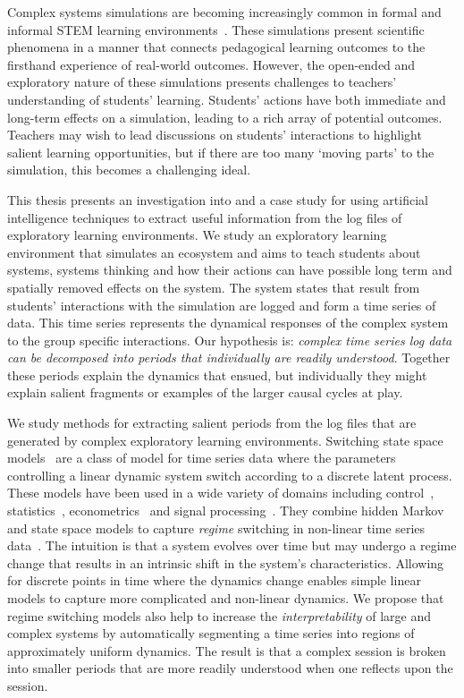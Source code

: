 Complex systems simulations are becoming increasingly common in formal and informal STEM learning environments~\citep{smordal2012hybrid}. These simulations present scientific phenomena in a manner that connects pedagogical learning outcomes to the firsthand experience of real-world outcomes. However, the open-ended and exploratory nature of these simulations presents challenges to teachers' understanding of students' learning. Students' actions have both immediate and long-term effects on a simulation, leading to a rich array of potential outcomes. Teachers may wish to lead discussions on students' interactions to highlight salient learning opportunities, but if there are too many `moving parts' to the simulation, this becomes a challenging ideal.

This thesis presents an investigation into and a case study for using artificial intelligence techniques to extract useful information from the log files of exploratory learning environments. We study an exploratory learning environment that simulates an ecosystem and aims to teach students about systems, systems thinking and how their actions can have possible long term and spatially removed effects on the system. The system states that result from students' interactions with the simulation are logged and form a time series of data. This time series represents the dynamical responses of the complex system to the group specific interactions. Our hypothesis is: \textit{complex time series log data can be decomposed into periods that individually are readily understood}. Together these periods explain the dynamics that ensued, but individually they might explain salient fragments or examples of the larger causal cycles at play.

We study methods for extracting salient periods from the log files that are generated by complex exploratory learning environments. Switching state space models~\citep{ghahramani2000variational} are a class of model for time series data where the parameters controlling a linear dynamic system switch according to a discrete latent process. These models have been used in a wide variety of domains including control~\citep{ikoma2002tracking}, statistics~\citep{cappe2009inference}, econometrics~\citep{giordani2007unified} and signal processing~\citep{kim1999state}. They combine hidden Markov and state space models to capture \textit{regime} switching in non-linear time series data~\citep{whiteley2010efficient}. The intuition is that a system evolves over time but may undergo a regime change that results in an intrinsic shift in the system's characteristics. Allowing for discrete points in time where the dynamics change enables simple linear models to capture more complicated and non-linear dynamics. We propose that regime switching models also help to increase the \textit{interpretability} of large and complex systems by automatically segmenting a time series into regions of approximately uniform dynamics. The result is that a complex session is broken into smaller periods that are more readily understood when one reflects upon the session.

